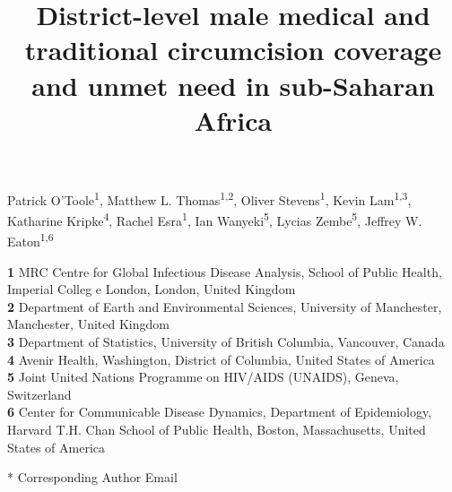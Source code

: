 \documentclass{article}
\title{District-level male medical and traditional circumcision coverage and unmet need in sub-Saharan Africa}
\author{}
\date{}
\begin{document}

\maketitle

\vspace{-1cm}

Patrick O'Toole\textsuperscript{1},
Matthew L. Thomas\textsuperscript{1,2},
Oliver Stevens\textsuperscript{1},
Kevin Lam\textsuperscript{1,3},
Katharine Kripke\textsuperscript{4},
Rachel Esra\textsuperscript{1},
Ian Wanyeki\textsuperscript{5},
Lycias Zembe\textsuperscript{5},
Jeffrey W. Eaton\textsuperscript{1,6} \\
\smallskip
  
\textbf{1} MRC Centre for Global Infectious Disease Analysis, School of Public Health, Imperial Colleg  e London, London, United Kingdom\\
\textbf{2} Department of Earth and Environmental Sciences, University of Manchester, Manchester, United Kingdom\\
\textbf{3} Department of Statistics, University of British Columbia, Vancouver, Canada\\
\textbf{4} Avenir Health, Washington, District of Columbia, United States of America\\
\textbf{5} Joint United Nations Programme on HIV/AIDS (UNAIDS), Geneva, Switzerland\\
\textbf{6} Center for Communicable Disease Dynamics, Department of Epidemiology, Harvard T.H. Chan School of Public Health, Boston, Massachusetts, United States of America\\

\smallskip

* Corresponding Author Email

\clearpage
\end{document}
